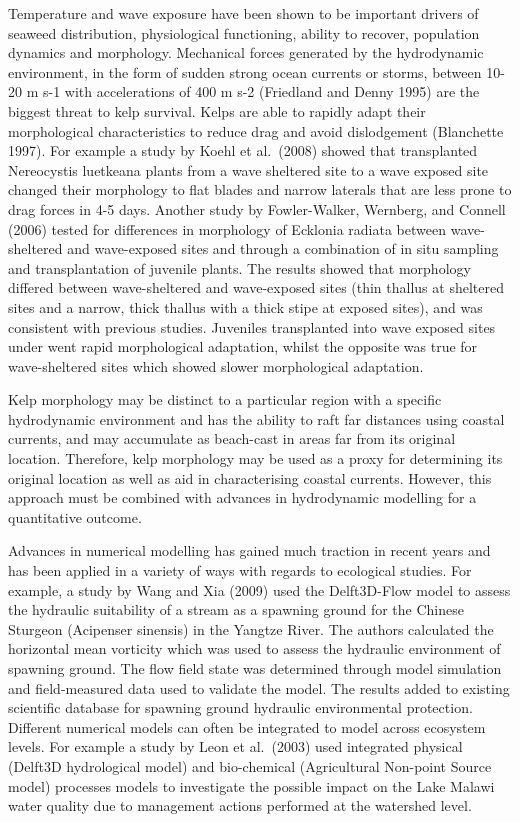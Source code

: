 \documentclass[]{article}
\begin{document}
Temperature and wave exposure have been shown to be important drivers of
seaweed distribution, physiological functioning, ability to recover,
population dynamics and morphology. Mechanical forces generated by the
hydrodynamic environment, in the form of sudden strong ocean currents or
storms, between 10- 20 m s-1 with accelerations of 400 m s-2 (Friedland
and Denny 1995) are the biggest threat to kelp survival. Kelps are able
to rapidly adapt their morphological characteristics to reduce drag and
avoid dislodgement (Blanchette 1997). For example a study by Koehl et
al.~(2008) showed that transplanted Nereocystis luetkeana plants from a
wave sheltered site to a wave exposed site changed their morphology to
flat blades and narrow laterals that are less prone to drag forces in
4-5 days. Another study by Fowler-Walker, Wernberg, and Connell (2006)
tested for differences in morphology of Ecklonia radiata between
wave-sheltered and wave-exposed sites and through a combination of in
situ sampling and transplantation of juvenile plants. The results showed
that morphology differed between wave-sheltered and wave-exposed sites
(thin thallus at sheltered sites and a narrow, thick thallus with a
thick stipe at exposed sites), and was consistent with previous studies.
Juveniles transplanted into wave exposed sites under went rapid
morphological adaptation, whilst the opposite was true for
wave-sheltered sites which showed slower morphological adaptation.

Kelp morphology may be distinct to a particular region with a specific
hydrodynamic environment and has the ability to raft far distances using
coastal currents, and may accumulate as beach-cast in areas far from its
original location. Therefore, kelp morphology may be used as a proxy for
determining its original location as well as aid in characterising
coastal currents. However, this approach must be combined with advances
in hydrodynamic modelling for a quantitative outcome.

Advances in numerical modelling has gained much traction in recent years
and has been applied in a variety of ways with regards to ecological
studies. For example, a study by Wang and Xia (2009) used the
Delft3D-Flow model to assess the hydraulic suitability of a stream as a
spawning ground for the Chinese Sturgeon (Acipenser sinensis) in the
Yangtze River. The authors calculated the horizontal mean vorticity
which was used to assess the hydraulic environment of spawning ground.
The flow field state was determined through model simulation and
field-measured data used to validate the model. The results added to
existing scientific database for spawning ground hydraulic environmental
protection. Different numerical models can often be integrated to model
across ecosystem levels. For example a study by Leon et al.~(2003) used
integrated physical (Delft3D hydrological model) and bio-chemical
(Agricultural Non-point Source model) processes models to investigate
the possible impact on the Lake Malawi water quality due to management
actions performed at the watershed level.
\end{document}
